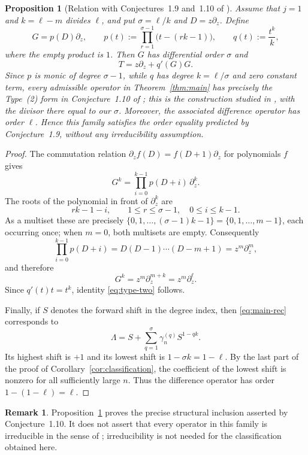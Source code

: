 \documentclass{amsart}
\newtheorem{proposition}[theorem]{Proposition}
\theoremstyle{definition}
\newtheorem{remark}[theorem]{Remark}
\begin{document}
\begin{proposition}[Relation with Conjectures~1.9 and~1.10 of
\cite{HoShTa}]\label{prop:conjectures}
Assume that \(j=1\) and \(k=\ell-m\) divides \(\ell\), and put
\(\sigma=\ell/k\) and \(D=z\partial_z\).  Define
\begin{equation}\label{eq:G-def}
G=p(D)\partial_z,
\qquad
p(t):=\prod_{r=1}^{\sigma-1}\bigl(t-(rk-1)\bigr),
\qquad
q(t):=\frac{t^k}{k},
\end{equation}
where the empty product is \(1\).  Then \(G\) has differential order
\(\sigma\) and
\begin{equation}\label{eq:type-two}
T=z\partial_z+q'(G)G.
\end{equation}
Since \(p\) is monic of degree \(\sigma-1\), while \(q\) has degree
\(k=\ell/\sigma\) and zero constant term, every admissible operator in
Theorem~\ref{thm:main} has precisely the Type~(2) form in
Conjecture~1.10 of \cite{HoShTa}; this is the construction studied in
\cite[Theorem~2.3]{Horozov}, with the divisor there equal to our \(\sigma\).  Moreover, the associated
difference operator has order \(\ell\).  Hence this family satisfies the
order equality predicted by Conjecture~1.9, without any irreducibility
assumption.
\end{proposition}

\begin{proof}
The commutation relation
\(
\partial_z f(D)=f(D+1)\partial_z
\)
for polynomials \(f\) gives
\[
G^k=\prod_{i=0}^{k-1}p(D+i)\,\partial_z^k.
\]
The roots of the polynomial in front of \(\partial_z^k\) are
\[
rk-1-i,
\qquad 1\le r\le\sigma-1,\quad 0\le i\le k-1.
\]
As a multiset these are precisely
\(\{0,1,\dots,(\sigma-1)k-1\}=\{0,1,\dots,m-1\}\), each occurring once;
when \(m=0\), both multisets are empty.  Consequently
\[
\prod_{i=0}^{k-1}p(D+i)
=D(D-1)\cdots(D-m+1)=z^m\partial_z^m,
\]
and therefore
\[
G^k=z^m\partial_z^{m+k}=z^m\partial_z^\ell.
\]
Since \(q'(t)t=t^k\), identity \eqref{eq:type-two} follows.

Finally, if \(S\) denotes the forward shift in the degree index, then
\eqref{eq:main-rec} corresponds to
\[
\Lambda=S+\sum_{q=1}^{\sigma}\gamma_n^{(q)}S^{1-qk}.
\]
Its highest shift is \(+1\) and its lowest shift is
\(1-\sigma k=1-\ell\).  By the last part of the proof of
Corollary~\ref{cor:classification}, the coefficient of the lowest shift is
nonzero for all sufficiently large \(n\).  Thus the difference operator has
order \(1-(1-\ell)=\ell\).
\end{proof}

\begin{remark}
Proposition~\ref{prop:conjectures} proves the precise structural inclusion
asserted by Conjecture~1.10.  It does not assert that every operator in this
family is irreducible in the sense of \cite{HoShTa}; irreducibility is not
needed for the classification obtained here.
\end{remark}
\end{document}
